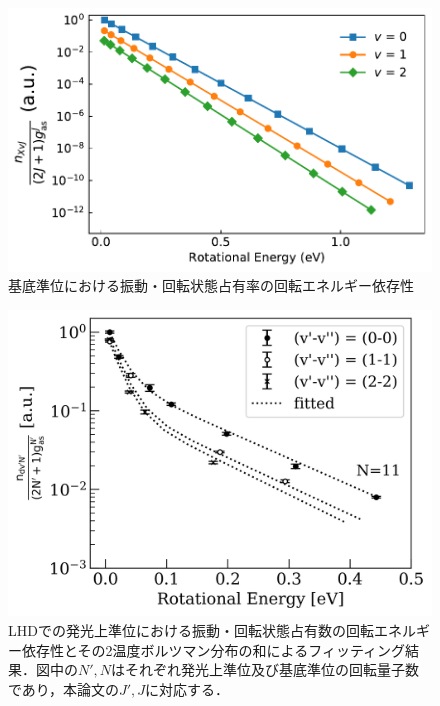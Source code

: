 \begin{figure}
    \centering
    \includegraphics[width=15cm]{pictures/ground-state-n.pdf}
    \caption{基底準位における振動・回転状態占有率の回転エネルギー依存性}
    \label{fig:ground-state-n}
\end{figure}

\begin{figure}
    \centering
    \includegraphics[width=15cm]{pictures/ishihara-upper-boltzmann.png}
    \caption[LHDでの発光上準位における振動・回転状態占有数の回転エネルギー依存性とその2温度ボルツマン分布の和によるフィッティング結果\cite{ishihara}]{LHDでの発光上準位における振動・回転状態占有数の回転エネルギー依存性とその2温度ボルツマン分布の和によるフィッティング結果\cite{ishihara}．図中の$N', N$はそれぞれ発光上準位及び基底準位の回転量子数であり，本論文の$J', J$に対応する．}
    \label{fig:ishihara-upper-boltzmann}
\end{figure}

